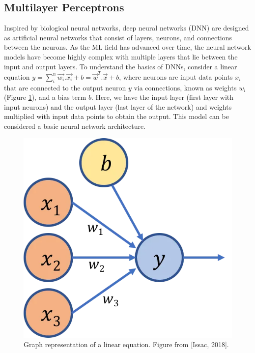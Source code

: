 \subsection{Multilayer Perceptrons}

Inspired by biological neural networks, deep neural networks (DNN) are designed as artificial neural networks that consist of layers, neurons, and connections between the neurons. As the ML field has advanced over time, the neural network models have become highly complex with multiple layers that lie between the input and output layers. To understand the basics of DNNs, consider a linear equation $y = \sum^n_i\vec{w_i} . \vec{x_i} + b = \vec{w}^T . \vec{x} + b$, where neurons are input data points $x_i$ that are connected to the output neuron $y$ via connections, known as weights $w_i$ (Figure \ref{fig:neuron}), and a bias term $b$. Here, we have the input layer (first layer with input neurons) and the output layer (last layer of the network)  and weights multiplied with input data points to obtain the output. This model can be considered a basic neural network architecture. 

\begin{figure}
  \centering
   \includegraphics[width=\linewidth]{Images/neuron.png}
   \caption{Graph representation of a linear equation. Figure from [Issac, 2018].}
   \label{fig:neuron}
\end{figure}

